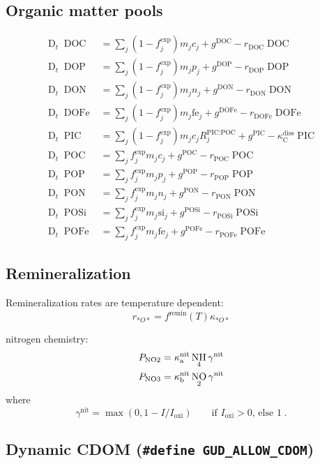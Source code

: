 \documentclass[11pt,letterpaper,english]{article}
\newcommand{\qtext}[1]{\qquad\text{#1}}
\def\|#1|{\operatorname{#1}}
\newcommand{\DDt}{\operatorname{D}_t}
\DeclareMathOperator{\NH}{NH}
\DeclareMathOperator{\NO}{NO}
\DeclareMathOperator{\DOC}{DOC}
\DeclareMathOperator{\DOP}{DOP}
\DeclareMathOperator{\DON}{DON}
\DeclareMathOperator{\DOFe}{DOFe}
\DeclareMathOperator{\POP}{POP}
\DeclareMathOperator{\PON}{PON}
\DeclareMathOperator{\POFe}{POFe}
\DeclareMathOperator{\POSi}{POSi}
\DeclareMathOperator{\PIC}{PIC}
\DeclareMathOperator{\POC}{POC}
\DeclareMathOperator{\NOii}{NO2}
\DeclareMathOperator{\NOiii}{NO3}
\newcommand{\C}{\mathrm{C}}
\newcommand{\fe}{\mathrm{fe}}
\renewcommand{\si}{\mathrm{si}}
\newcommand{\PICPOC}{{\text{PIC:POC}}}
\newcommand{\diss}{{\text{diss}}}
\newcommand{\nit}{{\text{nit}}}
\newcommand{\oxi}{{\text{oxi}}}
\newcommand{\remin}{{\text{remin}}}
\newcommand{\export}{{\text{exp}}}
\newcommand{\X}{c}
\begin{document}
\subsection{Organic matter pools}

\begin{align*}
  \DDt \DOC  &= \sum_j (1-f^\export_j) m_j \X_j  + g^{\DOC}  - r_{\DOC} \DOC
\\
  \DDt \DOP  &= \sum_j (1-f^\export_j) m_j p_j   + g^{\DOP}  - r_{\DOP} \DOP
\\
  \DDt \DON  &= \sum_j (1-f^\export_j) m_j n_j   + g^{\DON}  - r_{\DON} \DON
\\
  \DDt \DOFe &= \sum_j (1-f^\export_j) m_j \fe_j + g^{\DOFe} - r_{\DOFe} \DOFe
\\
  \DDt \PIC  &= \sum_j (1-f^\export_j) m_j \X_j R^\PICPOC_j + g^{\PIC}
                -\kappa^\diss_\C \PIC
\\
  \DDt \POC  &= \sum_j f^\export_j m_j \X_j  + g^{\POC}  - r_{\POC} \POC
\\
  \DDt \POP  &= \sum_j f^\export_j m_j p_j   + g^{\POP}  - r_{\POP} \POP
\\
  \DDt \PON  &= \sum_j f^\export_j m_j n_j   + g^{\PON}  - r_{\PON} \PON
\\
  \DDt \POSi &= \sum_j f^\export_j m_j \si_j + g^{\POSi} - r_{\POSi} \POSi
\\
  \DDt \POFe &= \sum_j f^\export_j m_j \fe_j + g^{\POFe} - r_{\POFe} \POFe
\end{align*}



\subsection{Remineralization}

Remineralization rates are temperature dependent:
\[
  r_{*O*} = f^\remin(T) \kappa_{*O*}
\]

nitrogen chemistry:
\begin{align*}
  P_{\NOii}  &= \kappa^{\|nit|}_{\rm a} \NH_4 \gamma^\nit \\
  P_{\NOiii} &= \kappa^{\|nit|}_{\rm b} \NO_2 \gamma^\nit
\end{align*}
where
\[
  \gamma^\nit = \max(0, 1-I/I_\oxi)
  \qtext{if } I_\oxi > 0 \text{, else } 1 \;.
\]



\subsection{Dynamic CDOM ({\tt \#define GUD\_ALLOW\_CDOM})}
\end{document}
